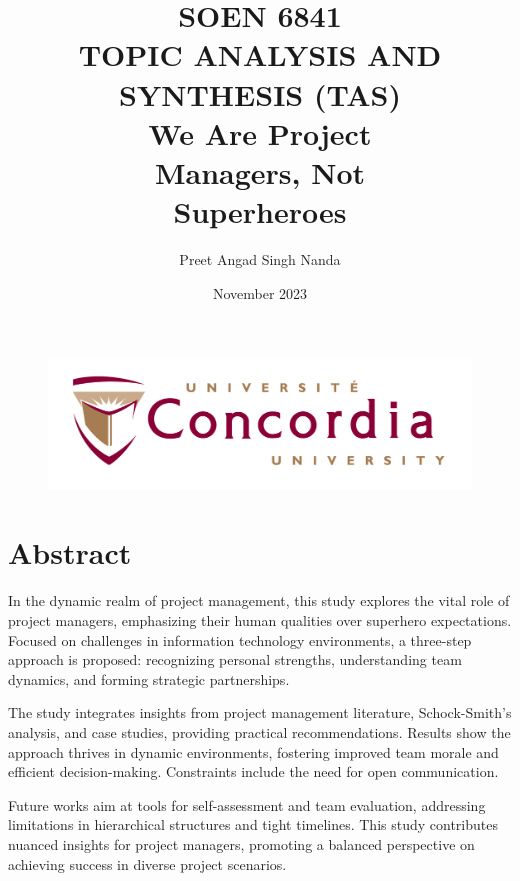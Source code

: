 \documentclass[11pt]{article}
\begin{document}
\begin{figure}
    \centering
    \includegraphics[width=14cm]{Concordia-logo.jpeg}
    \label{fig:Concordia}
\end{figure}

\title{\textbf{SOEN 6841 \\ \vspace{\baselineskip}  TOPIC ANALYSIS AND SYNTHESIS (TAS)
\\\vspace{\baselineskip}We Are Project
\\Managers, Not
\\Superheroes}}
\author{Preet Angad Singh Nanda}
\date{November 2023}

\maketitle
{}
\pagebreak
\tableofcontents

\pagebreak
\justifying
\section{Abstract}
In the dynamic realm of project management, this study explores the vital role of project managers, emphasizing their human qualities over superhero expectations. Focused on challenges in information technology environments, a three-step approach is proposed: recognizing personal strengths, understanding team dynamics, and forming strategic partnerships.

The study integrates insights from project management literature, Schock-Smith's analysis, and case studies, providing practical recommendations. Results show the approach thrives in dynamic environments, fostering improved team morale and efficient decision-making. Constraints include the need for open communication.

Future works aim at tools for self-assessment and team evaluation, addressing limitations in hierarchical structures and tight timelines. This study contributes nuanced insights for project managers, promoting a balanced perspective on achieving success in diverse project scenarios.
\end{document}
